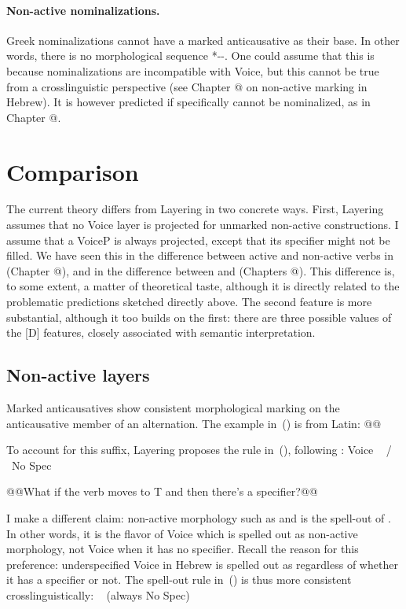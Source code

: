 \paragraph*{Non-active nominalizations.} Greek nominalizations cannot have a marked anticausative as their base. In other words, there is no morphological sequence *--. One could assume that this is because nominalizations are incompatible with Voice, but this cannot be true from a crosslinguistic perspective (see Chapter @ on non-active marking in Hebrew). It is however predicted if specifically {\vz} cannot be nominalized, as in Chapter @.


\section{Comparison}
The current theory differs from Layering in two concrete ways. First, Layering assumes that no Voice layer is projected for unmarked non-active constructions. I assume that a VoiceP is always projected, except that its specifier might not be filled. We have seen this in the difference between active and non-active verbs in {\tkal} (Chapter @), and in the difference between {\vz} and {\vd} (Chapters @). This difference is, to some extent, a matter of theoretical taste, although it is directly related to the problematic predictions sketched directly above. The second feature is more substantial, although it too builds on the first: there are three possible values of the [D] features, closely associated with semantic interpretation.

	\subsection{Non-active layers}
Marked anticausatives show consistent morphological marking on the anticausative member of an alternation. The example in~(\nextx) is from Latin:
\ex @@
\xe

To account for this suffix, Layering proposes the rule in~(\nextx), following \cite{embick04}:
\ex Voice \lra~ / \trace~No Spec
\xe

@@What if the verb moves to T and then there's a specifier?@@

I make a different claim: non-active morphology such as  and {\tnif} is the spell-out of {\vz}. In other words, it is the flavor of Voice which is spelled out as non-active morphology, not Voice when it has no specifier. Recall the reason for this preference: underspecified Voice in Hebrew is spelled out as {\tkal} regardless of whether it has a specifier or not. The spell-out rule in~(\nextx) is thus more consistent crosslinguistically:
\ex {\vz} \lra~ \hfill (always No Spec)
\xe

